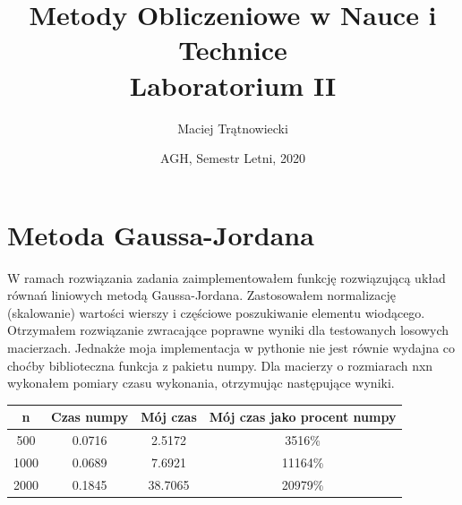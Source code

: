 \documentclass{article}
\title{Metody Obliczeniowe w Nauce i Technice\\ 
Laboratorium II}
\author{Maciej Trątnowiecki}
\date{AGH, Semestr Letni, 2020}
\begin{document}
    \maketitle
    \section{Metoda Gaussa-Jordana}
        W ramach rozwiązania zadania zaimplementowałem funkcję rozwiązującą układ równań liniowych metodą Gaussa-Jordana. Zastosowałem normalizację (skalowanie) wartości wierszy i częściowe poszukiwanie elementu wiodącego. Otrzymałem rozwiązanie zwracające poprawne wyniki dla testowanych losowych macierzach. Jednakże moja implementacja w pythonie nie jest równie wydajna co choćby biblioteczna funkcja z pakietu numpy. Dla macierzy o rozmiarach nxn wykonałem pomiary czasu wykonania, otrzymując następujące wyniki. 
        \begin{center}
        \begin{tabular}{|c|c|c|c|}
            \hline
             n & Czas numpy & Mój czas & Mój czas jako procent numpy\\
             \hline
             500 & 0.0716 & 2.5172 & 3516\% \\
             \hline
             1000 & 0.0689 & 7.6921  & 11164\% \\
             \hline
             2000 & 0.1845 & 38.7065  & 20979\% \\
             \hline
        \end{tabular}
        \end{center}\\
        
\end{document}
